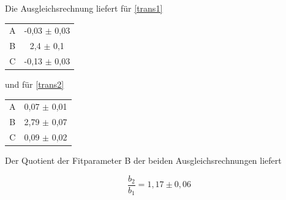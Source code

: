 Die Ausgleichsrechnung liefert für \ref{trans1}
\begin{table}
\centering
\begin{tabular}{cc} \toprule
\centering
A & -0,03 $\pm$ 0,03 \\
B & 2,4 $\pm$ 0,1 \\
C & -0,13 $\pm$ 0,03 \\
\bottomrule
\end{tabular}
\end{table}

und für \ref{trans2}

\begin{table}
\centering
\begin{tabular}{cc} \toprule
\centering
A & 0,07 $\pm$ 0,01 \\
B & 2,79 $\pm$ 0,07 \\
C & 0,09 $\pm$ 0,02 \\
\bottomrule
\end{tabular}
\end{table}

Der Quotient der Fitparameter B der beiden Ausgleichsrechnungen liefert

\begin{equation}
\frac{b_{2}}{b_{1}} = 1,17 \pm 0,06
\end{equation}
